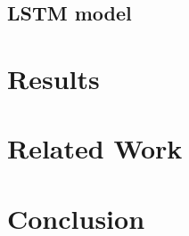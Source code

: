 \documentclass[]{article}
\begin{document}
\subsection{LSTM model}

\section{Results}

\section{Related Work}

\section{Conclusion}


\end{document}
